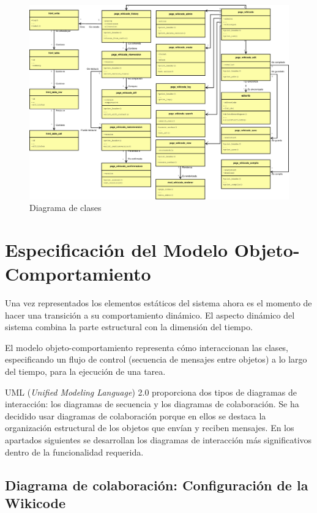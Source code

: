 \begin{figure}[h]
	\centering
	\includegraphics[width=1.1\textwidth]{./img/DiagramaCLASES.eps}
	\caption{Diagrama de clases}
\end{figure}

\newpage

\section{Especificación del Modelo Objeto-Comportamiento}

Una vez representados los elementos estáticos del sistema ahora es el momento de hacer una transición a su comportamiento dinámico. El aspecto dinámico del sistema combina la parte estructural con la dimensión del tiempo.

El modelo objeto-comportamiento representa cómo interaccionan las clases, especificando un flujo de control (secuencia de mensajes entre objetos) a lo largo del tiempo, para la ejecución de una tarea.

UML (\emph{Unified Modeling Language}) 2.0 proporciona dos tipos de diagramas de interacción: los diagramas de secuencia y los diagramas de colaboración. Se ha decidido usar diagramas de colaboración porque en ellos se destaca la organización estructural de los objetos que envían y reciben mensajes. En los apartados siguientes se desarrollan los diagramas de interacción más significativos dentro de la funcionalidad requerida.

\subsection{Diagrama de colaboración: Configuración de la Wikicode}

